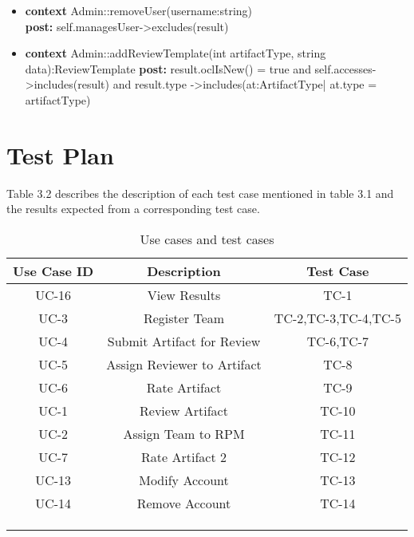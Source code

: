 \begin{itemize}
\item \textbf{context} Admin::removeUser(username:string)
\\
\textbf{post:} self.managesUser->excludes(result)


\item \textbf{context} Admin::addReviewTemplate(int artifactType, string data):ReviewTemplate
\textbf{post:} result.oclIsNew() = true and self.accesses->includes(result) and result.type ->includes(at:ArtifactType| at.type = artifactType)



\end{itemize}




\section{Test Plan}
Table 3.2 describes  the  description  of  each  test  case  mentioned in  table 3.1 and  the  results expected from a corresponding test case.

\begin{table}[h]
\centering
\caption{Use cases and test cases}
\label{my-label}
\begin{tabular}{ccc}
\hline

\multicolumn{1}{|c|}{\textbf{Use Case ID}} & \multicolumn{1}{c|}{\textbf{Description}} & \multicolumn{1}{c|}{\textbf{Test Case}} \\ \hline
\multicolumn{1}{|c|}{UC-16} & \multicolumn{1}{c|}{View Results} & \multicolumn{1}{c|}{TC-1} \\ \hline
\multicolumn{1}{|c|}{UC-3} & \multicolumn{1}{c|}{Register Team} & \multicolumn{1}{c|}{TC-2,TC-3,TC-4,TC-5} \\ \hline
\multicolumn{1}{|c|}{UC-4} & \multicolumn{1}{c|}{Submit Artifact for Review} & \multicolumn{1}{c|}{TC-6,TC-7} \\ \hline
\multicolumn{1}{|c|}{UC-5} & \multicolumn{1}{c|}{Assign Reviewer to Artifact} & \multicolumn{1}{c|}{TC-8} \\ \hline
\multicolumn{1}{|c|}{UC-6} & \multicolumn{1}{c|}{Rate Artifact} & \multicolumn{1}{c|}{TC-9} \\ \hline
\multicolumn{1}{|c|}{UC-1} & \multicolumn{1}{c|}{Review Artifact} & \multicolumn{1}{c|}{TC-10} \\ \hline
\multicolumn{1}{|c|}{UC-2} & \multicolumn{1}{c|}{Assign Team to RPM} & \multicolumn{1}{c|}{TC-11} \\ \hline
\multicolumn{1}{|c|}{UC-7} & \multicolumn{1}{c|}{Rate Artifact 2} & \multicolumn{1}{c|}{TC-12} \\ \hline
\multicolumn{1}{|c|}{UC-13} & \multicolumn{1}{c|}{Modify Account} & \multicolumn{1}{c|}{TC-13} \\ \hline
\multicolumn{1}{|c|}{UC-14} & \multicolumn{1}{c|}{Remove Account} & \multicolumn{1}{c|}{TC-14} \\ \hline
 &  &  \\
 &  &  \\
 &  & 
\end{tabular}
\end{table}

